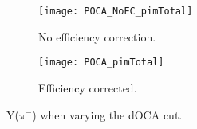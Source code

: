 \begin{figure}[!htb]
     \centering
     \begin{subfigure}[b]{\textwidth}
         \centering
         \texttt{[image: POCA\_NoEC\_pimTotal]}
         \caption{No efficiency correction.}
         \label{fig:pim_cutVarPOCA_NoEC}
     \end{subfigure}
     \hfill
    \begin{subfigure}[b]{\textwidth}
         \centering
         \texttt{[image: POCA\_pimTotal]}
         \caption{Efficiency corrected.}
         \label{fig:pim_cutVarPOCA_EC}
     \end{subfigure}
     \hfill
\caption{Y($\pi^-$) when varying the dOCA cut.}
\label{fig:pim_cutVarPOCA}
\end{figure}
